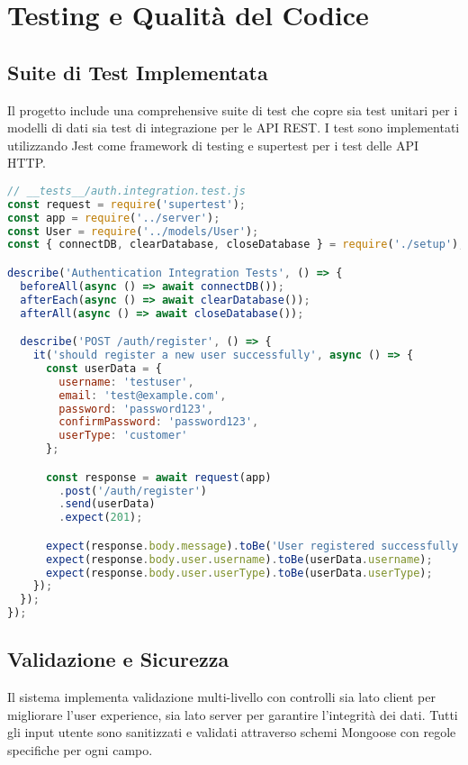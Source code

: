 \documentclass[12pt,a4paper]{article}
\begin{document}
\section{Testing e Qualità del Codice}

\subsection{Suite di Test Implementata}

Il progetto include una comprehensive suite di test che copre sia test unitari per i modelli di dati sia test di integrazione per le API REST. I test sono implementati utilizzando Jest come framework di testing e supertest per i test delle API HTTP.

\begin{lstlisting}[language=JavaScript, caption=Test di integrazione per l'autenticazione]
// __tests__/auth.integration.test.js
const request = require('supertest');
const app = require('../server');
const User = require('../models/User');
const { connectDB, clearDatabase, closeDatabase } = require('./setup');

describe('Authentication Integration Tests', () => {
  beforeAll(async () => await connectDB());
  afterEach(async () => await clearDatabase());
  afterAll(async () => await closeDatabase());

  describe('POST /auth/register', () => {
    it('should register a new user successfully', async () => {
      const userData = {
        username: 'testuser',
        email: 'test@example.com',
        password: 'password123',
        confirmPassword: 'password123',
        userType: 'customer'
      };

      const response = await request(app)
        .post('/auth/register')
        .send(userData)
        .expect(201);

      expect(response.body.message).toBe('User registered successfully');
      expect(response.body.user.username).toBe(userData.username);
      expect(response.body.user.userType).toBe(userData.userType);
    });
  });
});
\end{lstlisting}

\subsection{Validazione e Sicurezza}

Il sistema implementa validazione multi-livello con controlli sia lato client per migliorare l'user experience, sia lato server per garantire l'integrità dei dati. Tutti gli input utente sono sanitizzati e validati attraverso schemi Mongoose con regole specifiche per ogni campo.
\end{document}
